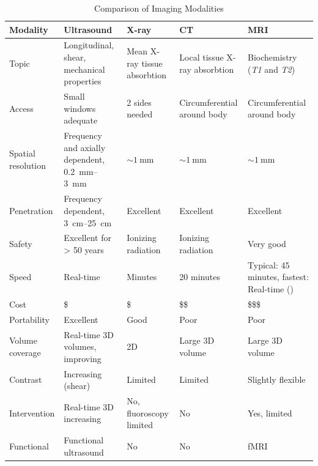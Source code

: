\begin{table}[ht]
	\centering
	\begin{tabularx}{\textwidth}{@{}XXXXX@{}}
		\toprule
		\textbf{Modality} & \textbf{Ultrasound} & \textbf{X-ray} & \textbf{CT} & \textbf{MRI} \\ \midrule
		Topic              & Longitudinal, shear, mechanical properties              & Mean X-ray tissue absorbtion & Local tissue X-ray absorbtion & Biochemistry (\textit{T1} and \textit{T2})    \\
		Access             & Small windows adequate                                  & 2 sides needed               & Circumferential around body   & Circumferential around body \\
		Spatial resolution & Frequency and axially dependent, \SIrange{0.2}{3}{\milli\meter} & $\sim \SI{1}{\milli \meter}$           & $\sim \SI{1}{\milli \meter}$            & $\sim \SI{1}{\milli \meter}$          \\
		Penetration     & Frequency dependent, \SIrange{3}{25}{\centi\meter} & Excellent               & Excellent          & Excellent                                 \\
		Safety          & Excellent for > 50 years          & Ionizing radiation      & Ionizing radiation & Very good                                 \\
		Speed           & Real-time & Minutes & 20 minutes & Typical: 45 minutes, fastest: Real-time (\glsxtrshort{low-res}) \\
		Cost            & \$                                            & \$                      & \$\$                 & \$\$\$                                       \\
		Portability     & Excellent                                     & Good                    & Poor               & Poor                                      \\
		Volume coverage & Real-time 3D volumes, improving               & 2D                      & Large 3D volume    & Large 3D volume                           \\
		Contrast        & Increasing (shear)                            & Limited                 & Limited            & Slightly flexible                         \\
		Intervention    & Real-time 3D increasing                       & No, fluoroscopy limited & No                 & Yes, limited                              \\
		Functional      & Functional ultrasound                         & No                      & No                 & fMRI                                      \\ \bottomrule
	\end{tabularx}
	\caption{Comparison of Imaging Modalities \cite{Szabo_UltrasoundBook_2}}
	\label{tab:imaging_modalities}
\end{table}



